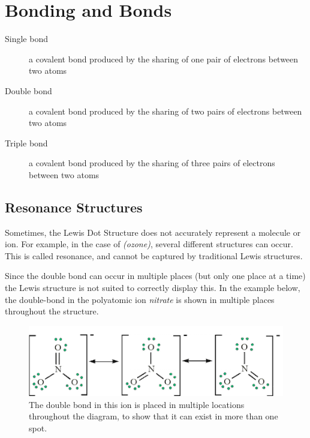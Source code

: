 \section{Bonding and Bonds}
\begin{description}
  \item[Single bond] a covalent bond produced by the sharing of one pair of
    electrons between two atoms
  \item[Double bond] a covalent bond produced by the sharing of two pairs of
    electrons between two atoms
  \item[Triple bond] a covalent bond produced by the sharing of three pairs of
    electrons between two atoms
\end{description}

\subsection{Resonance Structures}
Sometimes, the Lewis Dot Structure does not accurately represent a molecule or
ion.  For example, in the case of  \textit{(ozone)}, several different
structures can occur.  This is called resonance, and cannot be captured by
traditional Lewis structures.

Since the double bond can occur in multiple places (but only one place at a
time) the Lewis structure is not suited to correctly display this.  In the
example below, the double-bond in the polyatomic ion \textit{nitrate} is shown
in multiple places throughout the structure.

\begin{figure}[H]
  \centering
  \includegraphics{res/nitrate_resonance.png}
  \caption{The double bond in this ion is placed in multiple locations
  throughout the diagram, to show that it can exist in more than one spot.}
\end{figure}


